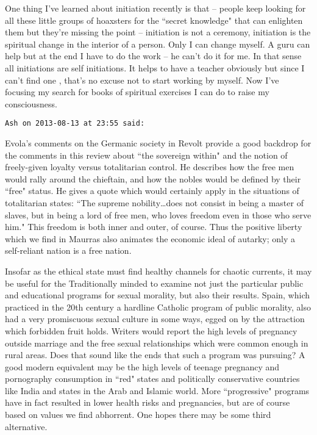 \begin{footnotesize}
\begin{sffamily}
One thing I've learned about initiation recently is that – people keep looking for all these little groups of hoaxsters for the ``secret knowledge" that can enlighten them but they're missing the point – initiation is not a ceremony, initiation is the spiritual change in the interior of a person. Only I can change myself. A guru can help but at the end I have to do the work – he can't do it for me. In that sense all initiations are self initiations. It helps to have a teacher obviously but since I can't find one , that's no excuse not to start working by myself. Now I've focusing my search for books of spiritual exercises I can do to raise my consciousness.


\hfill

\texttt{Ash on 2013-08-13 at 23:55 said: }

Evola's comments on the Germanic society in Revolt provide a good backdrop for the comments in this review about ``the sovereign within" and the notion of freely-given loyalty versus totalitarian control. He describes how the free men would rally around the chieftain, and how the nobles would be defined by their ``free" status. He gives a quote which would certainly apply in the situations of totalitarian states: ``The supreme nobility…does not consist in being a master of slaves, but in being a lord of free men, who loves freedom even in those who serve him." This freedom is both inner and outer, of course. Thus the positive liberty which we find in Maurras also animates the economic ideal of autarky; only a self-reliant nation is a free nation. 

Insofar as the ethical state must find healthy channels for chaotic currents, it may be useful for the Traditionally minded to examine not just the particular public and educational programs for sexual morality, but also their results. Spain, which practiced in the 20th century a hardline Catholic program of public morality, also had a very promiscuous sexual culture in some ways, egged on by the attraction which forbidden fruit holds. Writers would report the high levels of pregnancy outside marriage and the free sexual relationships which were common enough in rural areas. Does that sound like the ends that such a program was pursuing? A good modern equivalent may be the high levels of teenage pregnancy and pornography consumption in ``red" states and politically conservative countries like India and states in the Arab and Islamic world. More ``progressive" programs have in fact resulted in lower health risks and pregnancies, but are of course based on values we find abhorrent. One hopes there may be some third alternative. 


\end{sffamily}
\end{footnotesize}
